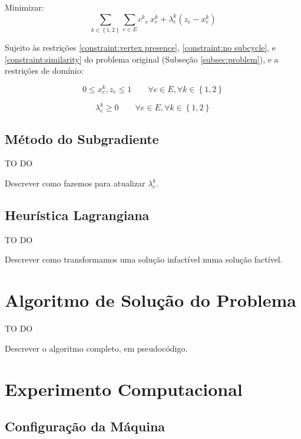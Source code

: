 \documentclass{article}
\newcommand{\subsecref}[1]{(Subseção \ref{#1})}
\newcommand{\Set}[1]{\ensuremath{\left\{#1\right\}}}
\newcommand{\Sum}[1]{\ensuremath{\displaystyle\sum\limits_{#1}}}
\newcommand{\edge}{\ensuremath{e}}
\newcommand{\edges}{\ensuremath{E}}
\newcommand{\ncycles}{2}
\newcommand{\allCycles}{\ensuremath{\Set{1, \ncycles}}}
\newcommand{\cycle}{\ensuremath{k}}
\newcommand{\cost}[1]{\ensuremath{c^{#1}}}
\newcommand{\costke}{\ensuremath{\cost{\cycle}_{\edge}}}
\newcommand{\X}[2]{\ensuremath{x^{#1}_{#2}}}
\newcommand{\xke}{\ensuremath{\X{\cycle}{\edge}}}
\newcommand{\ze}{\ensuremath{z_{\edge}}}
\newcommand{\lagrange}{\ensuremath{\lambda}}
\newcommand{\lagrangeke}{\ensuremath{\lagrange_{\edge}^{\cycle}}}
\begin{document}
Minimizar:
\begin{equation}
    \label{eq:goal lagrangian}
 	\Sum{\cycle \in \allCycles}
 	\Sum{\edge \in \edges} 	
 	\costke \ \xke
 	+ \lagrangeke \left( \ze - \xke \right)
\end{equation}

Sujeito às restrições \ref{constraint:vertex presence}, \ref{constraint:no subcycle}, e \ref{constraint:similarity} do problema original \subsecref{subsec:problem}, e a restrições de domínio:

\begin{equation}
	\label{constraint:value of variables}
	0 \leqslant \xke, \ze \leqslant 1
	\qquad
	\forall \edge \in \edges,
	\forall \cycle \in \allCycles
\end{equation}

\begin{equation}
	\label{constraint: lagrange}
	\lagrangeke \geqslant 0
	\qquad
	\forall \edge \in \edges,
	\forall \cycle \in \allCycles
\end{equation}

\subsection{Método do Subgradiente}

{\huge TO DO}

Descrever como fazemos para atualizar $\lagrangeke$.

\subsection{Heurística Lagrangiana}

{\huge TO DO}

Descrever como transformamos uma solução infactível numa solução factível.

\section{Algoritmo de Solução do Problema}

{\huge TO DO}

Descrever o algoritmo completo, em pseudocódigo.

\section{Experimento Computacional}

\subsection{Configuração da Máquina}
\end{document}

